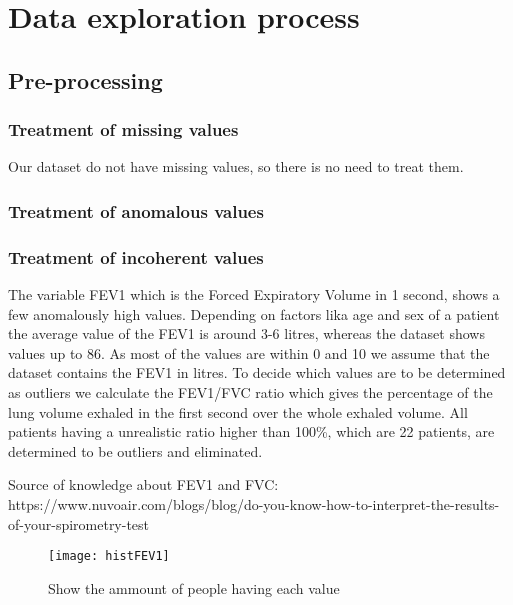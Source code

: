

\section{Data exploration process}

\subsection{Pre-processing}
\subsubsection{Treatment of missing values}
Our dataset do not have missing values, so there is no need to treat them.
\subsubsection{Treatment of anomalous values}
\subsubsection{Treatment of incoherent values}
The variable FEV1 which is the Forced Expiratory Volume in 1 second, shows a few anomalously high values. Depending on factors lika age and sex of a patient the average value of the FEV1 is around 3-6 litres, whereas the dataset shows values up to 86. As most of the values are within 0 and 10 we assume that the dataset contains the FEV1 in litres. To decide which values are to be determined as outliers we calculate the FEV1/FVC ratio which gives the percentage of the lung volume exhaled in the first second over the whole exhaled volume. All patients having a unrealistic ratio higher than 100\%, which are 22 patients, are determined to be outliers and eliminated.

Source of knowledge about FEV1 and FVC:
https://www.nuvoair.com/blogs/blog/do-you-know-how-to-interpret-the-results-of-your-spirometry-test

\begin{figure}[bh]
\centering
\texttt{[image: histFEV1]}
\label{fig:histFEV1}
\caption{Show the ammount of people having each value}
\end{figure}
